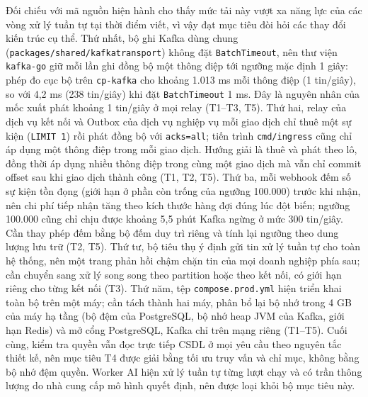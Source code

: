 Đối chiếu với mã nguồn hiện hành cho thấy mức tải này vượt xa năng lực của các vòng xử lý tuần tự tại thời điểm viết, vì vậy đạt mục tiêu đòi hỏi các thay đổi kiến trúc cụ thể.
Thứ nhất, bộ ghi Kafka dùng chung (\texttt{packages/\hspace{0pt}shared/\hspace{0pt}kafkatransport}) không đặt \texttt{BatchTimeout}, nên thư viện \texttt{kafka-go} giữ mỗi lần ghi đồng bộ một thông điệp tới ngưỡng mặc định 1 giây: phép đo cục bộ trên \texttt{cp-\hspace{0pt}kafka} cho khoảng 1.013 ms mỗi thông điệp (1 tin/giây), so với 4,2 ms (238 tin/giây) khi đặt \texttt{BatchTimeout} 1 ms. Đây là nguyên nhân của mốc xuất phát khoảng 1 tin/giây ở mọi relay (T1--T3, T5).
Thứ hai, relay của dịch vụ kết nối và Outbox của dịch vụ nghiệp vụ mỗi giao dịch chỉ thuê một sự kiện (\texttt{LIMIT 1}) rồi phát đồng bộ với \texttt{acks=all}; tiến trình \texttt{cmd/\hspace{0pt}ingress} cũng chỉ áp dụng một thông điệp trong mỗi giao dịch. Hướng giải là thuê và phát theo lô, đồng thời áp dụng nhiều thông điệp trong cùng một giao dịch mà vẫn chỉ commit offset sau khi giao dịch thành công (T1, T2, T5).
Thứ ba, mỗi webhook đếm số sự kiện tồn đọng (giới hạn ở phần còn trống của ngưỡng 100.000) trước khi nhận, nên chi phí tiếp nhận tăng theo kích thước hàng đợi đúng lúc đột biến; ngưỡng 100.000 cũng chỉ chịu được khoảng 5,5 phút Kafka ngừng ở mức 300 tin/giây. Cần thay phép đếm bằng bộ đếm duy trì riêng và tính lại ngưỡng theo dung lượng lưu trữ (T2, T5).
Thứ tư, bộ tiêu thụ ý định gửi tin xử lý tuần tự cho toàn hệ thống, nên một trang phản hồi chậm chặn tin của mọi doanh nghiệp phía sau; cần chuyển sang xử lý song song theo partition hoặc theo kết nối, có giới hạn riêng cho từng kết nối (T3).
Thứ năm, tệp \texttt{compose.\hspace{0pt}prod.\hspace{0pt}yml} hiện triển khai toàn bộ trên một máy; cần tách thành hai máy, phân bổ lại bộ nhớ trong 4 GB của máy hạ tầng (bộ đệm của PostgreSQL, bộ nhớ heap JVM của Kafka, giới hạn Redis) và mở cổng PostgreSQL, Kafka chỉ trên mạng riêng (T1--T5).
Cuối cùng, kiểm tra quyền vẫn đọc trực tiếp CSDL ở mọi yêu cầu theo nguyên tắc thiết kế, nên mục tiêu T4 được giải bằng tối ưu truy vấn và chỉ mục, không bằng bộ nhớ đệm quyền.
Worker AI hiện xử lý tuần tự từng lượt chạy và có trần thông lượng do nhà cung cấp mô hình quyết định, nên được loại khỏi bộ mục tiêu này.

